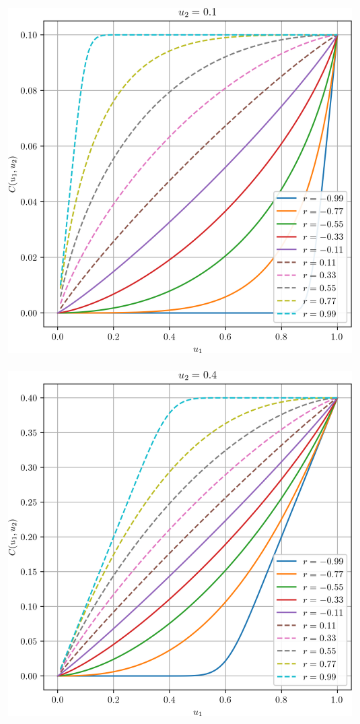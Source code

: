 \begin{figure}
    \centering
    \begin{subfigure}{0.4\linewidth}
        \centering
        \includegraphics[width=\linewidth]{Images/Guassian_copula/gaussian_copula_0.png}
    \end{subfigure}\hfill
    \begin{subfigure}{0.4\linewidth}
        \centering
        \includegraphics[width=\linewidth]{Images/Guassian_copula/gaussian_copula_1.png}

\end{subfigure}
\end{figure}

